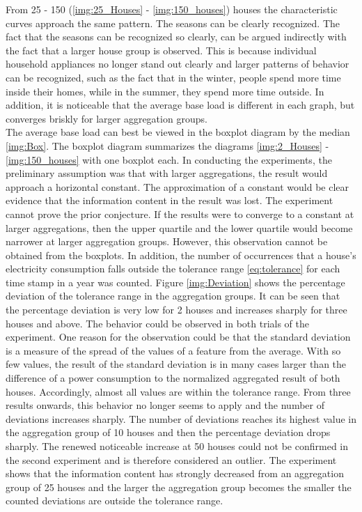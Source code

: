 From 25 - 150 (\ref{img:25_Houses} - \ref{img:150_houses}) houses the characteristic curves approach the same pattern. The seasons can be clearly recognized. The fact that the seasons can be recognized so clearly, can be argued indirectly with the fact that a larger house group is observed. This is because individual household appliances no longer stand out clearly and larger patterns of behavior can be recognized, such as the fact that in the winter, people spend more time inside their homes, while in the summer, they spend more time outside. In addition, it is noticeable that the average base load is different in each graph, but converges briskly for larger aggregation groups. \\
The average base load can best be viewed in the boxplot diagram by the median \ref{img:Box}. The boxplot diagram summarizes the diagrams \ref{img:2_Houses} - \ref{img:150_houses} with one boxplot each. In conducting the experiments, the preliminary assumption was that with larger aggregations, the result would approach a horizontal constant. The approximation of a constant would be clear evidence that the information content in the result was lost. The experiment cannot prove the prior conjecture. If the results were to converge to a constant at larger aggregations, then the upper quartile and the lower quartile would become narrower at larger aggregation groups. However, this observation cannot be obtained from the boxplots. 
In addition, the number of occurrences that a house's electricity consumption falls outside the tolerance range \ref{eq:tolerance} for each time stamp in a year was counted. Figure \ref{img:Deviation} shows the percentage deviation of the tolerance range in the aggregation groups. It can be seen that the percentage deviation is very low for 2 houses and increases sharply for three houses and above. The behavior could be observed in both trials of the experiment. One reason for the observation could be that the standard deviation is a measure of the spread of the values of a feature from the average. With so few values, the result of the standard deviation is in many cases larger than the difference of a power consumption to the normalized aggregated result of both houses. Accordingly, almost all values are within the tolerance range. From three results onwards, this behavior no longer seems to apply and the number of deviations increases sharply. The number of deviations reaches its highest value in the aggregation group of 10 houses and then the percentage deviation drops sharply. The renewed noticeable increase at 50 houses could not be confirmed in the second experiment and is therefore considered an outlier. The experiment shows that the information content has strongly decreased from an aggregation group of 25 houses and the larger the aggregation group becomes the smaller the counted deviations are outside the tolerance range.
